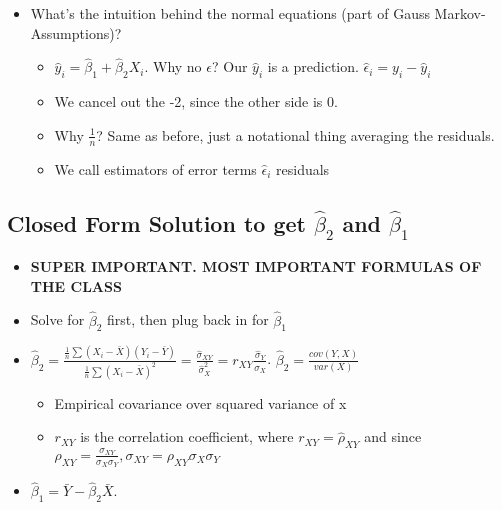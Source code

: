 \documentclass[10pt, oneside]{article}
\begin{document}
\begin{itemize}
\begin{itemize}
\begin{itemize}
\begin{itemize}
            \end{itemize}
        \end{itemize}
        \item What's the intuition behind the normal equations (part of Gauss Markov-Assumptions)?
        \begin{itemize}
            \item $\hat y_i = \hat \beta_1 + \hat \beta_2 X_i$. Why no $\epsilon$? Our $\hat y_i$ is a prediction. $\hat \epsilon_i = y_i - \hat y_i$
            \item We cancel out the -2, since the other side is 0.
            \item Why $\frac{1}{n}$? Same as before, just a notational thing averaging the residuals.
            \item We call estimators of error terms $\hat \epsilon_i$ residuals
        \end{itemize}
    \end{itemize}
\end{itemize}

\subsection{Closed Form Solution to get $\hat \beta_2$ and $\hat \beta_1$}
\begin{itemize}
    \item \textbf{SUPER IMPORTANT. MOST IMPORTANT FORMULAS OF THE CLASS}
    \item Solve for $\hat \beta_2$ first, then plug back in for $\hat \beta_1$
    \item $\hat \beta_2 = \frac{\frac{1}{n} \sum(X_i - \bar X) (Y_i - \bar Y)}{\frac{1}{n} \sum (X_i - \bar X)^2} = \frac{\hat \sigma_{XY}}{\hat \sigma^2 _X} = r_{XY} \frac{\hat \sigma_Y}{\hat \sigma_X}$. $\hat \beta_2 = \frac{cov(Y,X)}{var(X)}$
    \begin{itemize}
        \item Empirical covariance over squared variance of x
        \item $r_{XY}$ is the correlation coefficient, where $r_{XY}=\hat \rho_{XY}$ and since \\$\rho_{XY}=\frac{\sigma_{XY}}{\sigma_X \sigma_Y}, \sigma_{XY}=\rho_{XY}\sigma_X \sigma_Y$
    \end{itemize}
    \item $\hat \beta_1 = \bar Y - \hat \beta_2 \bar X$. 

\end{itemize}
\end{document}
